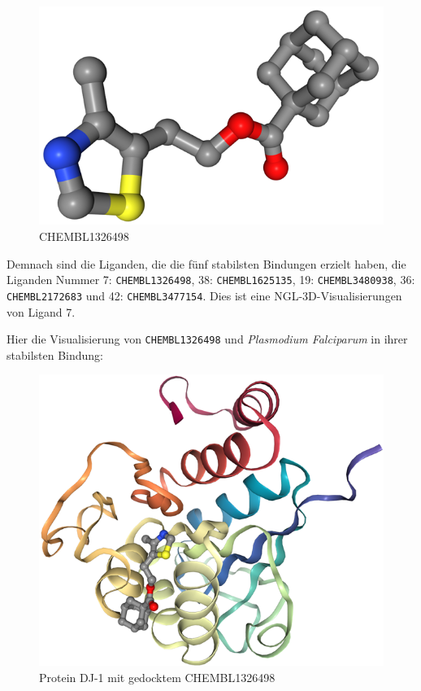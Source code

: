 \documentclass[10pt]{article}
\begin{document}
    \begin{figure}
        \includegraphics[width=\linewidth]{CHEMBL1326498}
        \caption{CHEMBL1326498}\label{fig:figure-CHEMBL1326498}
    \end{figure}

    Demnach sind die Liganden, die die fünf stabilsten Bindungen erzielt haben, die Liganden Nummer
    7: \texttt{CHEMBL1326498},
    38: \texttt{CHEMBL1625135}, 19: \texttt{CHEMBL3480938}, 36: \texttt{CHEMBL2172683} und 42: \texttt{CHEMBL3477154}.
    Dies ist eine NGL-3D-Visualisierungen von Ligand 7.



    Hier die Visualisierung von \texttt{CHEMBL1326498} und \emph{Plasmodium Falciparum} in ihrer stabilsten Bindung:

    \begin{figure}[h]
        \centering
        \includegraphics[width=0.6\linewidth]{Protein DJ-1 mit gedocktem CHEMBL1326498}
        \caption{Protein DJ-1 mit gedocktem CHEMBL1326498}\label{fig:figure-pf-CHEMBL1326498}
    \end{figure}
\end{document}
